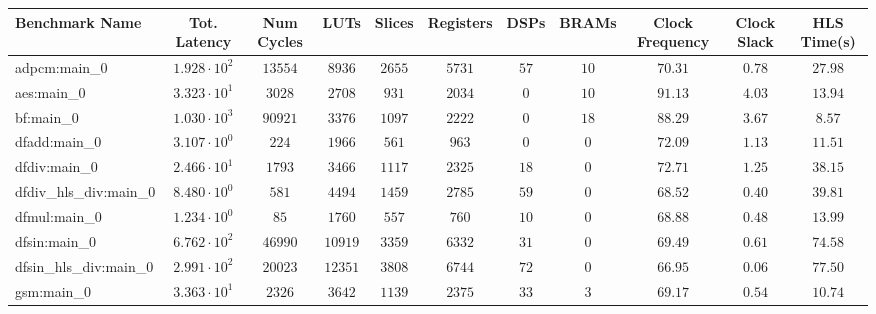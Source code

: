 \begin{tabular}{|l|c|c|c|c|c|c|c|c|c|c|}
\hline
Benchmark Name          & Tot. Latency           & Num Cycles & LUTs      & Slices    & Registers & DSPs    & BRAMs   & Clock Frequency & Clock Slack & HLS Time(s) \\
\hline
adpcm:main\_0           & $ 1.928 \cdot 10^{2} $ & $ 13554  $ & $ 8936  $ & $ 2655  $ & $ 5731  $ & $ 57  $ & $ 10  $ & $ 70.31       $ & $ 0.78    $ & $ 27.98   $ \\
aes:main\_0             & $ 3.323 \cdot 10^{1} $ & $ 3028   $ & $ 2708  $ & $ 931   $ & $ 2034  $ & $ 0   $ & $ 10  $ & $ 91.13       $ & $ 4.03    $ & $ 13.94   $ \\
bf:main\_0              & $ 1.030 \cdot 10^{3} $ & $ 90921  $ & $ 3376  $ & $ 1097  $ & $ 2222  $ & $ 0   $ & $ 18  $ & $ 88.29       $ & $ 3.67    $ & $ 8.57    $ \\
dfadd:main\_0           & $ 3.107 \cdot 10^{0} $ & $ 224    $ & $ 1966  $ & $ 561   $ & $ 963   $ & $ 0   $ & $ 0   $ & $ 72.09       $ & $ 1.13    $ & $ 11.51   $ \\
dfdiv:main\_0           & $ 2.466 \cdot 10^{1} $ & $ 1793   $ & $ 3466  $ & $ 1117  $ & $ 2325  $ & $ 18  $ & $ 0   $ & $ 72.71       $ & $ 1.25    $ & $ 38.15   $ \\
dfdiv\_hls\_div:main\_0 & $ 8.480 \cdot 10^{0} $ & $ 581    $ & $ 4494  $ & $ 1459  $ & $ 2785  $ & $ 59  $ & $ 0   $ & $ 68.52       $ & $ 0.40    $ & $ 39.81   $ \\
dfmul:main\_0           & $ 1.234 \cdot 10^{0} $ & $ 85     $ & $ 1760  $ & $ 557   $ & $ 760   $ & $ 10  $ & $ 0   $ & $ 68.88       $ & $ 0.48    $ & $ 13.99   $ \\
dfsin:main\_0           & $ 6.762 \cdot 10^{2} $ & $ 46990  $ & $ 10919 $ & $ 3359  $ & $ 6332  $ & $ 31  $ & $ 0   $ & $ 69.49       $ & $ 0.61    $ & $ 74.58   $ \\
dfsin\_hls\_div:main\_0 & $ 2.991 \cdot 10^{2} $ & $ 20023  $ & $ 12351 $ & $ 3808  $ & $ 6744  $ & $ 72  $ & $ 0   $ & $ 66.95       $ & $ 0.06    $ & $ 77.50   $ \\
gsm:main\_0             & $ 3.363 \cdot 10^{1} $ & $ 2326   $ & $ 3642  $ & $ 1139  $ & $ 2375  $ & $ 33  $ & $ 3   $ & $ 69.17       $ & $ 0.54    $ & $ 10.74   $ \\

\end{tabular}
